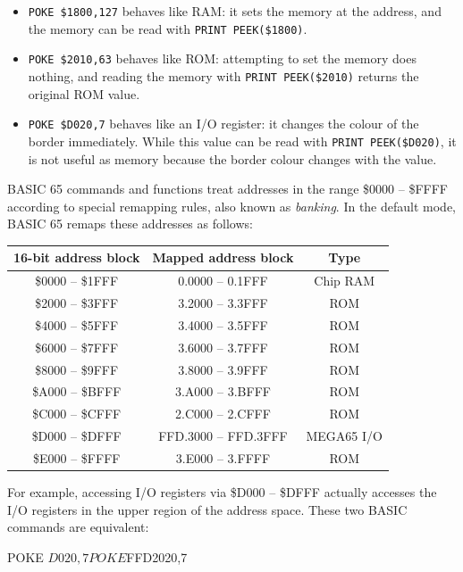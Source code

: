\begin{itemize}
\item \texttt{POKE \$1800,127} behaves like RAM: it sets the memory at the address, and the memory can be read with \texttt{PRINT PEEK(\$1800)}.
\item \texttt{POKE \$2010,63} behaves like ROM: attempting to set the memory does nothing, and reading the memory with \texttt{PRINT PEEK(\$2010)} returns the original ROM value.
\item \texttt{POKE \$D020,7} behaves like an I/O register: it changes the colour of the border immediately. While this value can be read with \texttt{PRINT PEEK(\$D020)}, it is not useful as memory because the border colour changes with the value.
\end{itemize}

\newpage

BASIC 65 commands and functions treat addresses in the range \$0000 -- \$FFFF according to special remapping rules, also known as {\em banking}. In the default mode, BASIC 65 remaps these addresses as follows:

\begin{center}
\begin{tabular}{|c|c|c|}
\hline
{\bf 16-bit address block} & {\bf Mapped address block} & {\bf Type} \\
\hline
\$0000 -- \$1FFF & 0.0000 -- 0.1FFF & Chip RAM \\
\hline
\$2000 -- \$3FFF & 3.2000 -- 3.3FFF & ROM \\
\hline
\$4000 -- \$5FFF & 3.4000 -- 3.5FFF & ROM \\
\hline
\$6000 -- \$7FFF & 3.6000 -- 3.7FFF & ROM \\
\hline
\$8000 -- \$9FFF & 3.8000 -- 3.9FFF & ROM \\
\hline
\$A000 -- \$BFFF & 3.A000 -- 3.BFFF & ROM \\
\hline
\$C000 -- \$CFFF & 2.C000 -- 2.CFFF & ROM \\
\hline
\$D000 -- \$DFFF & FFD.3000 -- FFD.3FFF & MEGA65 I/O\\
\hline
\$E000 -- \$FFFF & 3.E000 -- 3.FFFF & ROM \\
\hline
\end{tabular}
\end{center}

For example, accessing I/O registers via \$D000 -- \$DFFF actually accesses the I/O registers in the upper region of the address space. These two BASIC commands are equivalent:

\begin{basiccode}
POKE $D020,7

POKE $FFD2020,7
\end{basiccode}

